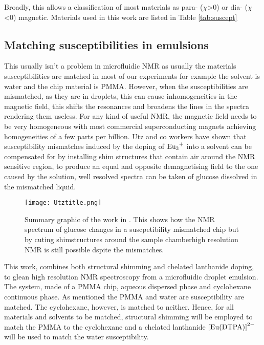 Broadly, this allows a classification of most materials as para- ($\chi$>0) or dia- ($\chi$<0) magnetic. Materials used in this work are listed in Table \ref{tab:suscept}

\subsection{Matching susceptibilities in emulsions}


This usually isn’t a problem in microfluidic NMR as usually the materials susceptibilities are matched
in most of our experiments for example the solvent is water and the chip material is PMMA. However,
when the susceptibilities are mismatched, as they are in droplets, this can cause inhomogeneities in
the magnetic field, this shifts the resonances and broadens the lines in the spectra rendering them
useless. For any kind of useful NMR, the magnetic field needs to be very homogeneous with most commercial
superconducting magnets achieving homogeneities of a few parts per billion. Utz and co workers\citep{RN118}
have shown that susceptibility mismatches induced by the doping of $\ce{Eu3+}$ into a solvent can be
compensated for by installing shim structures that contain air around the NMR sensitive region, to produce an
equal and opposite demagnetising field to the one caused by the solution, well
resolved spectra can be taken of glucose dissolved in the mismatched liquid.
\begin{figure}
  \texttt{[image: Utztitle.png]}
  \caption{Summary graphic of the work in \citep{RN118}. This shows how the NMR spectrum of glucose
  changes in a suscpetibility mismatched chip but by cuting shimstructures around the sample chamberhigh resolution
  NMR is still possible dspite the mismatches.}
  \label{ShimStructUtz}
\end{figure}

This work, combines both structural shimming and chelated lanthanide doping, to glean high resolution NMR spectroscopy from a microfluidic droplet emulsion. The system, made of a PMMA chip, aqueous dispersed phase and cyclohexane continuous phase. As mentioned the PMMA and water are susceptibility are matched. The cyclohexane, however, is matched to neither. Hence,  for
all materials and solvents to be matched, structural shimming will be employed to match the PMMA to the cyclohexane and a chelated lanthanide $\ce{[Eu(DTPA)]}^{2-}$  will be used to match the water susceptibility.

